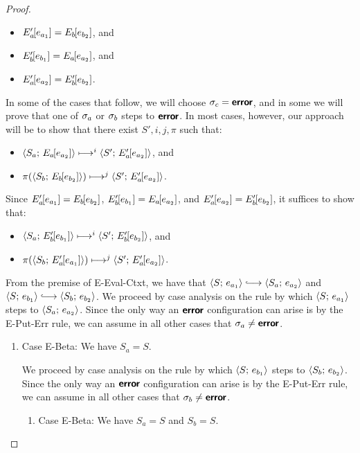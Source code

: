 \begin{proof}
  \begin{itemize}
  \item $E'_a\hspace{-1mm}\left[e_{a_1}\right] = E_b\hspace{-1mm}\left[e_{b_2}\right]$, and
  \item $E'_b\hspace{-1mm}\left[e_{b_1}\right] = E_a\hspace{-1mm}\left[e_{a_2}\right]$, and
  \item $E'_a\hspace{-1mm}\left[e_{a_2}\right] =
  E'_b\hspace{-1mm}\left[e_{b_2}\right]$.
  \end{itemize}

  In some of the cases that follow, we will choose $\sigma_c = \textbf{\textsf{error}}$,
  and in some we will prove that one of $\sigma_a$ or $\sigma_b$ steps
  to $\textbf{\textsf{error}}$.  In most cases, however, our approach will be to show
  that there exist $S', i, j, \pi$ such that:
  \begin{itemize}
  \item $\langle S_a;\, E_a\hspace{-1mm}\left[e_{a_2}\right] \rangle \longmapsto^i
    \langle S';\, E'_a\hspace{-1mm}\left[e_{a_2}\right] \rangle$, and
  \item $\pi(\langle S_b;\, E_b\hspace{-1mm}\left[e_{b_2}\right] \rangle) \longmapsto^j
    \langle S';\, E'_a\hspace{-1mm}\left[e_{a_2}\right] \rangle$.
  \end{itemize}
  Since $E'_a\hspace{-1mm}\left[e_{a_1}\right] = E_b\hspace{-1mm}\left[e_{b_2}\right]$,
  $E'_b\hspace{-1mm}\left[e_{b_1}\right] = E_a\hspace{-1mm}\left[e_{a_2}\right]$, and
  $E'_a\hspace{-1mm}\left[e_{a_2}\right] = E'_b\hspace{-1mm}\left[e_{b_2}\right]$, it suffices
  to show that:
  \begin{itemize}
  \item $\langle S_a;\, E'_b\hspace{-1mm}\left[e_{b_1}\right] \rangle \longmapsto^i
    \langle S';\, E'_b\hspace{-1mm}\left[e_{b_2}\right] \rangle$, and
  \item $\pi(\langle S_b;\, E'_a\hspace{-1mm}\left[e_{a_1}\right] \rangle) \longmapsto^j
    \langle S';\, E'_a\hspace{-1mm}\left[e_{a_2}\right] \rangle$.
  \end{itemize}
  From the premise of {\sc E-Eval-Ctxt}, we have that
  $\config{S}{e_{a_1}} \parstepsto \config{S_a}{e_{a_2}}$ and
  $\config{S}{e_{b_1}} \parstepsto \config{S_b}{e_{b_2}}$.  We proceed
  by case analysis on the rule by which $\langle S;\, e_{a_1} \rangle$ steps to
  $\langle S_a;\, e_{a_2} \rangle$.  Since the only way an $\textbf{\textsf{error}}$
  configuration can arise is by the {\sc E-Put-Err} rule, we can
  assume in all other cases that $\sigma_a \neq \textbf{\textsf{error}}$.

  \begin{enumerate}
  \item Case {\sc E-Beta}: We have $S_a = S$.

    We proceed by case analysis on the rule by which
    $\langle S;\, e_{b_1} \rangle$ steps to $\langle S_b;\, e_{b_2} \rangle$.  Since the
    only way an $\textbf{\textsf{error}}$ configuration can arise is by the {\sc
      E-Put-Err} rule, we can assume in all other cases that $\sigma_b
    \neq \textbf{\textsf{error}}$.
    \begin{enumerate}
    \item \label{slqc-beta-beta}Case {\sc E-Beta}: We have $S_a = S$
      and $S_b = S$.


\end{enumerate}
\end{enumerate}
\end{proof}
